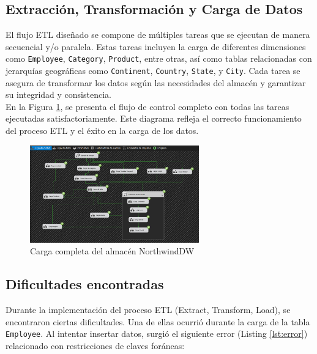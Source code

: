 \documentclass{article}
\begin{document}
	\subsection{Extracción, Transformación y Carga de Datos}
	
	El flujo ETL diseñado se compone de múltiples tareas que se ejecutan de manera secuencial y/o paralela. Estas tareas incluyen la carga de diferentes dimensiones como \texttt{Employee}, \texttt{Category}, \texttt{Product}, entre otras, así como tablas relacionadas con jerarquías geográficas como \texttt{Continent}, \texttt{Country}, \texttt{State}, y \texttt{City}. Cada tarea se asegura de transformar los datos según las necesidades del almacén y garantizar su integridad y consistencia.
	\\
	
	En la Figura \ref{fig:NorthWind}, se presenta el flujo de control completo con todas las tareas ejecutadas satisfactoriamente. Este diagrama refleja el correcto funcionamiento del proceso ETL y el éxito en la carga de los datos.
	
	\begin{figure}[H]
		\begin{center} 
			\includegraphics[width=0.65\textwidth]{images/cargaNorthwind.png} %
			\caption{Carga completa del almacén NorthwindDW}
			\label{fig:NorthWind}
		\end{center}
	\end{figure}
	
	\subsection{Dificultades encontradas}
	Durante la implementación del proceso ETL (Extract, Transform, Load), se encontraron ciertas dificultades. Una de ellas ocurrió durante la carga de la tabla \texttt{Employee}. Al intentar insertar datos, surgió el siguiente error (Listing \ref{lst:error}) relacionado con restricciones de claves foráneas:
	
\end{document}
